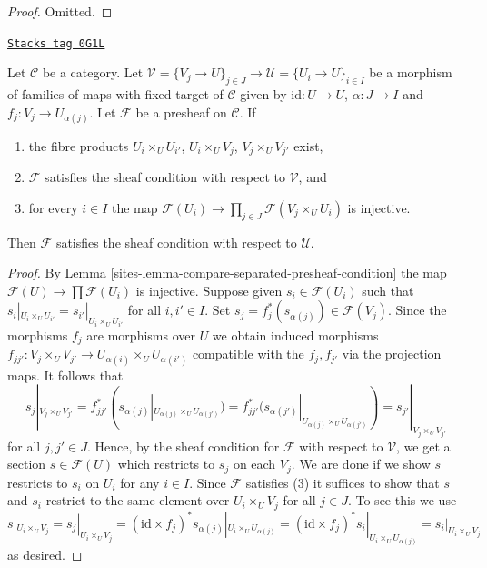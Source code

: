 \begin{proof}
Omitted.
\end{proof}

\begin{lemma}
\label{sites-lemma-compare-sheaf-condition}
\href{https://stacks.math.columbia.edu/tag/0G1L}{\texttt{Stacks tag 0G1L}}

Let $\mathcal{C}$ be a category. Let $\mathcal{V} = \{V_j \to U\}_{j \in J} \to
\mathcal{U} = \{U_i \to U\}_{i \in I}$ be a morphism of families of maps
with fixed target of $\mathcal{C}$ given by $\text{id} : U \to U$,
$\alpha : J \to I$ and $f_j : V_j \to U_{\alpha(j)}$. Let $\mathcal{F}$
be a presheaf on $\mathcal{C}$. If
\begin{enumerate}
\item the fibre products $U_i \times_U U_{i'}$, $U_i \times_U V_j$,
$V_j \times_U V_{j'}$ exist,
\item $\mathcal{F}$ satisfies the sheaf condition with respect to
$\mathcal{V}$, and
\item for every $i \in I$ the map
$\mathcal{F}(U_i) \to \prod_{j \in J} \mathcal{F}(V_j \times_U U_i)$
is injective.
\end{enumerate}
Then $\mathcal{F}$ satisfies the sheaf condition with respect to $\mathcal{U}$.
\end{lemma}

\begin{proof}

By Lemma \ref{sites-lemma-compare-separated-presheaf-condition} the map
$\mathcal{F}(U) \to \prod \mathcal{F}(U_i)$ is injective.
Suppose given
$s_i \in \mathcal{F}(U_i)$ such that $s_i|_{U_i \times_U U_{i'}}
= s_{i'}|_{U_i \times_U U_{i'}}$ for all $i, i' \in I$.
Set $s_j = f_j^*(s_{\alpha(j)}) \in \mathcal{F}(V_j)$.
Since the morphisms $f_j$ are morphisms over $U$ we obtain
induced morphisms $f_{jj'} : V_j \times_U V_{j'} \to
U_{\alpha(i)} \times_U U_{\alpha(i')}$ compatible with the
$f_j, f_{j'}$ via the projection maps. It follows that
$$
s_j|_{V_j \times_U V_{j'}}
= f_{jj'}^*(s_{\alpha(j)}|_{U_{\alpha(j)} \times_U U_{\alpha(j')}})
= f_{jj'}^*(s_{\alpha(j')}|_{U_{\alpha(j)} \times_U U_{\alpha(j')}})
= s_{j'}|_{V_j \times_U V_{j'}}
$$
for all $j, j' \in J$. Hence, by the sheaf condition
for $\mathcal{F}$ with respect to $\mathcal{V}$, we get a section
$s \in \mathcal{F}(U)$ which restricts to $s_j$ on each $V_j$.
We are done if we show $s$ restricts to $s_i$ on $U_i$
for any $i \in I$. Since $\mathcal{F}$ satisfies (3) it
suffices to show that $s$ and $s_i$ restrict to the
same element over $U_i \times_U V_j$ for all $j \in J$.
To see this we use
$$
s|_{U_i \times_U V_j} = s_j|_{U_i \times_U V_j} =
(\text{id} \times f_j)^*s_{\alpha(j)}|_{U_i \times_U U_{\alpha(j)}} =
(\text{id} \times f_j)^*s_i|_{U_i \times_U U_{\alpha(j)}} =
s_i|_{U_i \times_U V_j}
$$
as desired.
\end{proof}


